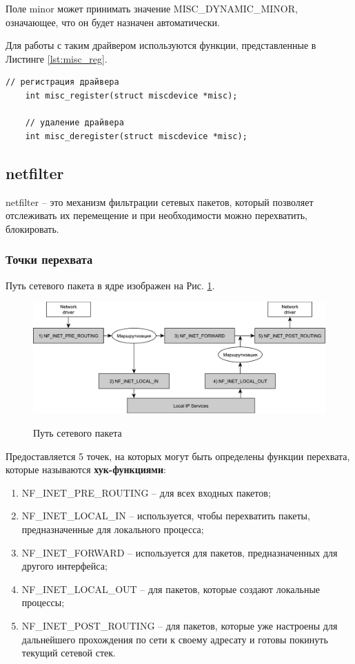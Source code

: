 Поле minor может принимать значение MISC\_DYNAMIC\_MINOR, означающее, что он будет назначен автоматически. 

Для работы с таким драйвером используются функции, представленные в Листинге \ref{lst:misc_reg}.

\begin{lstlisting}[caption = {Функции для регистрации и удаления misc драйвера}, label=lst:misc_reg]
	// регистрация драйвера
	int misc_register(struct miscdevice *misc);
	
	// удаление драйвера
	int misc_deregister(struct miscdevice *misc);
\end{lstlisting}

\subsection{netfilter}
netfilter -- это механизм фильтрации сетевых пакетов, который позволяет отслеживать их перемещение и при необходимости можно перехватить, блокировать. \cite{hook}

\subsubsection{Точки перехвата}
Путь сетевого пакета в ядре изображен на Рис. \ref{fig2:image}. \\

\begin{figure}[ph!]
	\centering
	\begin{center}
		{\includegraphics[scale=0.6]{img/packets.pdf}}
		\caption{Путь сетевого пакета}
		\label{fig2:image}
	\end{center}
\end{figure}

Предоставляется 5 точек, на которых могут быть определены функции перехвата, которые называются \textbf{хук-функциями}:
\begin{enumerate}
	\item NF\_INET\_PRE\_ROUTING – для всех входных пакетов;
	\item NF\_INET\_LOCAL\_IN – используется, чтобы перехватить пакеты, предназначенные для локального процесса;
	\item NF\_INET\_FORWARD – используется для пакетов, предназначенных для другого интерфейса;
	\item NF\_INET\_LOCAL\_OUT – для пакетов, которые создают локальные процессы;
	\item NF\_INET\_POST\_ROUTING – для пакетов, которые уже настроены для дальнейшего прохождения по сети к своему адресату и готовы покинуть текущий сетевой стек. \newline
\end{enumerate}

